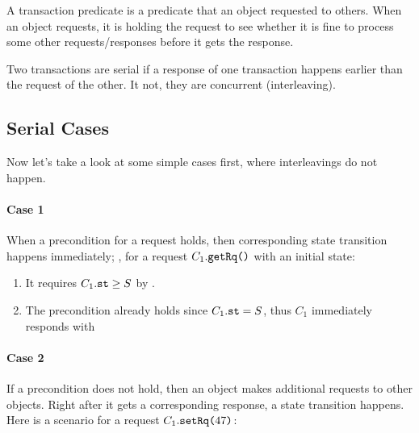 \documentclass[format=manuscript]{acmart}
\begin{document}
\begin{definition}
  A transaction predicate is a predicate that an object requested to
  others. When an object requests, it is holding the request to see whether it
  is fine to process some other requests/responses before it gets the response.
\end{definition}

\begin{definition}
  Two transactions are serial if a response of one transaction happens earlier
  than the request of the other. It not, they are concurrent (interleaving).
\end{definition}

\subsection{Serial Cases}

Now let's take a look at some simple cases first, where interleavings do not
happen.

\paragraph{Case 1}\label{serial-case1}
When a precondition for a request holds, then corresponding state transition
happens immediately; \eg{}, for a request $C_1.\texttt{getRq()}$ with an initial
state:

\begin{enumerate}
\item It requires $C_1.\texttt{st} \geq S$ by .
\item The precondition already holds since $C_1.\texttt{st} = S$, thus $C_1$
  immediately responds with
\end{enumerate}

\paragraph{Case 2}\label{serial-case2}
If a precondition does not hold, then an object makes additional requests to
other objects. Right after it gets a corresponding response, a state transition
happens. Here is a scenario for a request $C_1.\texttt{setRq(}47\texttt{)}$:
\end{document}
